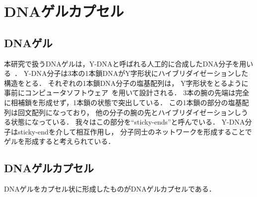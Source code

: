 \chapter{DNAゲルカプセル}

\section{DNAゲル}

本研究で扱うDNAゲルは，Y-DNAと呼ばれる人工的に合成したDNA分子を用いる~\cite{sato2019sequence}．
Y-DNA分子は3本の1本鎖DNAがY字形状にハイブリダイゼーションした構造をとる．
それぞれの1本鎖DNA分子の塩基配列は，
Y字形状をとるように事前にコンピュータソフトウェア~\cite{zadeh2011nupack}を用いて設計される．
3本の腕の先端は完全に相補鎖を形成せず，1本鎖の状態で突出している．
この1本鎖の部分の塩基配列は回文配列になっており，
他の分子の腕の先とハイブリダイゼーションしうる状態になっている．
我々はこの部分を``sticky-ends''と呼んでいる．
Y-DNA分子はsticky-endを介して相互作用し，
分子同士のネットワークを形成することでゲルを形成すると考えられている．

\section{DNAゲルカプセル}

DNAゲルをカプセル状に形成したものがDNAゲルカプセルである．

